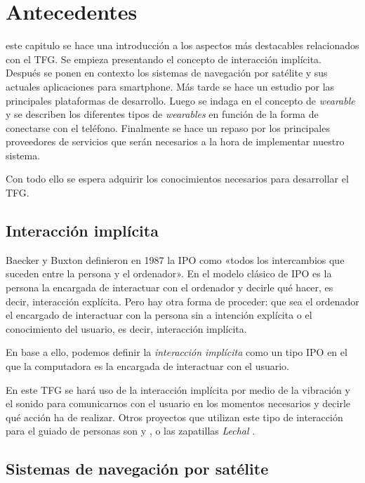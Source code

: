 \chapter{Antecedentes}
\label{chap:antecedentes}

 este capitulo se hace una introducción a los aspectos más destacables relacionados con
el \acs{TFG}. Se empieza presentando el concepto de interacción implícita. Después se ponen en
contexto los sistemas de navegación por satélite y sus actuales aplicaciones para smartphone. Más
tarde se hace un estudio por las principales plataformas de desarrollo. Luego se indaga en el
concepto de \emph{wearable} y se describen los diferentes tipos de \emph{wearables} en función de la
forma de conectarse con el teléfono. Finalmente se hace un repaso por los principales proveedores de
servicios que serán necesarios a la hora de implementar nuestro sistema.

Con todo ello se espera adquirir los conocimientos necesarios para desarrollar el \acs{TFG}.

\section{Interacción implícita}

Baecker y Buxton definieron en 1987 la \acf{IPO} como «todos los intercambios que suceden entre la
  persona y el ordenador». En el modelo clásico de \acs{IPO} es la persona la encargada de
interactuar con el ordenador y decirle qué hacer, es decir, interacción explícita. Pero hay otra
forma de proceder: que sea el ordenador el encargado de interactuar con la persona sin a intención
explícita o el conocimiento del usuario, es decir, interacción implícita.

En base a ello, podemos definir la \emph{interacción implícita} como un tipo \acs{IPO} en el que la
computadora es la encargada de interactuar con el usuario.

En este \acs{TFG} se hará uso de la interacción implícita por medio de la vibración y el sonido para
comunicarnos con el usuario en los momentos necesarios y decirle qué acción ha de realizar. Otros
proyectos que utilizan este tipo de interacción para el guiado de personas son \cite{Boemo12} y
\cite{Merino13}, o las zapatillas \emph{Lechal} \cite{Lechal}.

\section{Sistemas de navegación por satélite}

